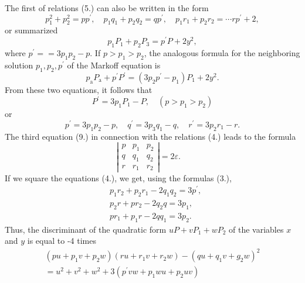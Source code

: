 \documentclass[12pt]{article}
\begin{document}
The first of relations (5.) can also be written in the form
\begin{equation*}    
p_{1}^{2}+p_{2}^{2}=p p^{\prime}, \quad p_{1} q_{1}+p_{2} q_{2}=q p^{\prime} , \quad p_{1} r_{1}+p_{2} r_{2}=\cdots r p^{\prime}+2,  \tag{9.}
\end{equation*}
or summarized
\begin{equation*}
p_{1} P_{1}+p_{2} P_{3}=p^{\prime} P+2 y^{2}, \tag{10.}
\end{equation*}
where $p^{\prime}==3 p_{1} p_{2}-p$. If $p>p_{1}>p_{2}$, the analogous formula for the neighboring solution $p_{1}, p_{2}, p^{\prime}$ of the Markoff equation is
\begin{equation*}
p_{\mathrm{a}} P_{\mathrm{a}}+p^{\prime} P^{\prime}=\left(3 p_{2} p^{\prime}-p_{1}\right) P_{1}+2 y^{2} . 
\end{equation*}
From these two equations, it follows that
\begin{equation*}
P^{\prime}=3 p_{1} P_{1}-P,  \quad \left(p>p_{1}>p_{2}\right) \tag{11.}
\end{equation*}
or
\begin{equation*}
p^{\prime}=3 p_{1} p_{2}-p, \quad q^{\prime}=3 p_{3} q_{1}-q, \quad r^{\prime}=3 p_{2} r_{1}-r. \tag{12.}
\end{equation*}
The third equation (9.) in connection with the relations (4.) leads to the formula
\begin{equation*}
\left|\begin{array}{lll}
p & p_{1} & p_{2}  \\
q & q_{1} & q_{2} \\
r & r_{1} & r_{2}
\end{array}\right|=2 \varepsilon.  \quad \tag{13.}
\end{equation*}
If we square the equations (4.), we get, using the formulas (3.),
\begin{align*}
& p_{1} r_{2}+p_{2} r_{1}-2 q_{1} q_{2}=3 p^{\prime}, \\
& p_{2} r+p r_{2}-2 q_{2} q=3 p_{1},  \tag{14.}\\
& p r_{1}+p_{1} r-2 q q_{1}=3 p_{2}.
\end{align*}
Thus, the discriminant of the quadratic form 
$u P+v P_{1}+w P_{2}$ of the variables $x$ and $y$ is equal to -4 times
\begin{gather*}
\left(p u+p_{1} v+p_{2} w\right)\left(r u+r_{1} v+r_{2} w\right)-\left(q u+q_{1} v+g_{2} w\right)^{2}  \tag{15.}\\
=u^{2}+v^{2}+w^{2}+3\left(p^{\prime} v w+p_{1} w u+p_{2} u v\right)
\end{gather*}
\end{document}
